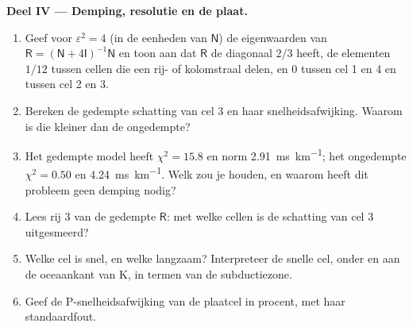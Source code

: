 \begin{problem}
\noindent\textbf{Deel IV --- Demping, resolutie en de plaat.}
\begin{enumerate}[resume]
  \item Geef voor $\varepsilon^2 = 4$ (in de eenheden van $\mathsf N$) de
        eigenwaarden van $\mathsf R = (\mathsf N + 4\mathsf I)^{-1}\mathsf N$ en
        toon aan dat $\mathsf R$ de diagonaal $2/3$ heeft, de elementen $1/12$
        tussen cellen die een rij- of kolomstraal delen, en $0$ tussen cel 1 en 4
        en tussen cel 2 en 3.
  \item Bereken de gedempte schatting van cel 3 en haar snelheidsafwijking. Waarom
        is die kleiner dan de ongedempte?
  \item Het gedempte model heeft $\chi^2 = 15.8$ en norm \qty{2.91}{ms.km^{-1}};
        het ongedempte $\chi^2 = 0.50$ en \qty{4.24}{ms.km^{-1}}. Welk zou je
        houden, en waarom heeft dit probleem geen demping nodig?
  \item Lees rij 3 van de gedempte $\mathsf R$: met welke cellen is de schatting
        van cel 3 uitgesmeerd?
  \item Welke cel is snel, en welke langzaam? Interpreteer de snelle cel, onder en
        aan de oceaankant van K, in termen van de subductiezone.
  \item Geef de P-snelheidsafwijking van de plaatcel in procent, met haar
        standaardfout.
\end{enumerate}
\end{problem}
